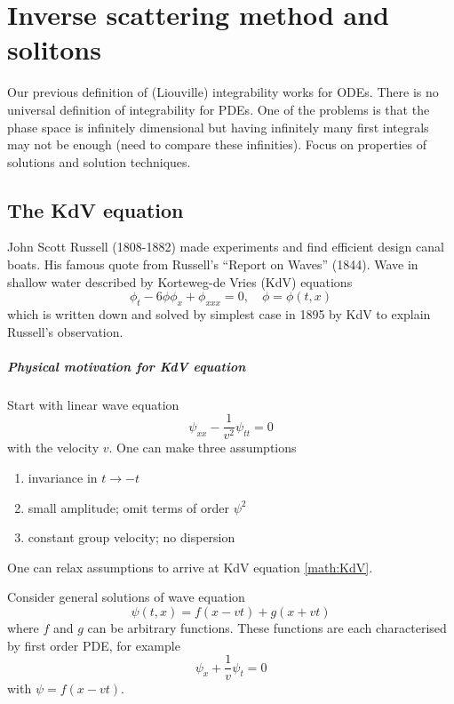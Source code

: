 \chapter{Inverse scattering method and solitons}
Our previous definition of (Liouville) integrability works for ODEs. There is no universal definition of integrability for PDEs. One of the problems is that the phase space is infinitely dimensional but having infinitely many first integrals may not be enough (need to compare these infinities). Focus on properties of solutions and solution techniques.

\section{The KdV equation}
John Scott Russell (1808-1882) made experiments  and find efficient design canal boats. His famous quote from Russell's ``Report on Waves'' (1844). Wave in shallow water described by Korteweg-de Vries (KdV) equations
\begin{equation}
	\phi_t - 6 \phi \phi_x + \phi_{x x x} = 0, \quad \phi = \phi(t, x)
	\label{math:KdV}
\end{equation}
which is written down and solved by simplest case in 1895 by KdV to explain Russell's observation.

\paragraph{Physical motivation for KdV equation}
Start with linear wave equation 
\begin{equation*}
	\psi_{x x} - \frac{1}{v^2} \psi_{tt} = 0
\end{equation*}
with the velocity $v$. One can make three assumptions
\begin{enumerate}
	\item invariance in $t \rightarrow -t$
	\item small amplitude; omit terms of order $\psi^2$
	\item constant group velocity; no dispersion
\end{enumerate}
One can relax assumptions to arrive at KdV equation \eqref{math:KdV}.

Consider general solutions of wave equation
\begin{equation*}
	\psi(t, x) = f(x-vt) + g(x+vt)
\end{equation*}
where $f$ and $g$ can be arbitrary functions. These functions are each characterised by first order PDE, for example
\begin{equation*}
	\psi_x + \frac{1}{v} \psi_t = 0
\end{equation*}
with $\psi = f(x-vt)$.

